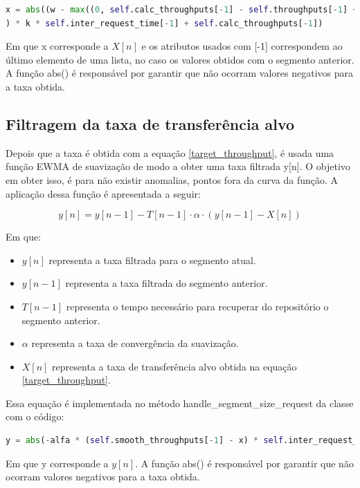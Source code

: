 \documentclass[10pt,twocolumn,letterpaper]{article}
\begin{document}
	\begin{lstlisting}[language=python]
x = abs((w - max((0, self.calc_throughputs[-1] - self.throughputs[-1] + w))
) * k * self.inter_request_time[-1] + self.calc_throughputs[-1])
	\end{lstlisting}
	
	Em que x corresponde a $X[n]$ e os atributos usados com [-1] correspondem ao último elemento de uma lista, no caso os valores obtidos com o segmento anterior. A função abs() é responsável por garantir que não ocorram valores negativos para a taxa obtida.
	
	\subsection{Filtragem da taxa de transferência alvo}
	Depois que a taxa é obtida com a equação \ref{target_throughput}, é usada uma função EWMA de suavização de modo a obter uma taxa filtrada y[n]. O objetivo em obter isso, é para não existir anomalias, pontos fora da curva da função. A aplicação dessa função é apresentada a seguir:
	
	\begin{equation} \label{smooth_throughput}
		y[n] = y[n-1] - T[n-1] \cdot \alpha \cdot (y[n-1] - X[n])
	\end{equation}
	
	Em que: 
	\begin{itemize}
		\item $y[n]$ representa a taxa filtrada para o segmento atual.
		\item $y[n-1]$ representa a taxa filtrada do segmento anterior.
		\item $T[n-1]$ representa o tempo necessário para recuperar do repositório o segmento anterior.
		\item $\alpha$ representa a taxa de convergência da suavização.
		\item $X[n]$ representa a taxa de transferência alvo obtida na equação \ref{target_throughput}.
	\end{itemize}
	
	Essa equação é implementada no método handle\_segment\_size\_request da classe com o código:
	
	\begin{lstlisting}[language=python]
y = abs(-alfa * (self.smooth_throughputs[-1] - x) * self.inter_request_time[-1] + self.smooth_throughputs[-1])
	\end{lstlisting}
	
	Em que y corresponde a $y[n]$. A função abs() é responsável por garantir que não ocorram valores negativos para a taxa obtida.
	
\end{document}
